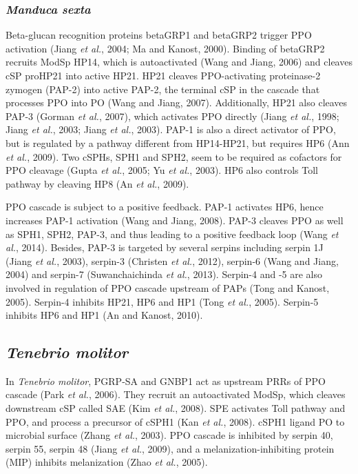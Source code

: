 \documentclass[11pt]{article}
\begin{document}
\subsubsection{\textit{Manduca sexta}}
Beta-glucan recognition proteins betaGRP1 and betaGRP2 trigger PPO activation (Jiang \textit{et al.}, 2004; Ma and Kanost, 2000). 
Binding of betaGRP2 recruits ModSp HP14, which is autoactivated (Wang and Jiang, 2006) and cleaves cSP proHP21 into active HP21. 
HP21 cleaves PPO-activating proteinase-2 zymogen (PAP-2) into active PAP-2, the terminal cSP in the cascade that processes PPO into PO (Wang and Jiang, 2007). 
Additionally, HP21 also cleaves PAP-3 (Gorman \textit{et al.}, 2007), which activates PPO directly (Jiang \textit{et al.}, 1998; Jiang \textit{et al.}, 2003; Jiang \textit{et al.}, 2003). 
PAP-1 is also a direct activator of PPO, but is regulated by a pathway different from HP14-HP21, but requires HP6 (Ann \textit{et al.}, 2009). 
Two cSPHs, SPH1 and SPH2, seem to be required as cofactors for PPO cleavage (Gupta \textit{et al.}, 2005; Yu \textit{et al.}, 2003). 
HP6 also controls Toll pathway by cleaving HP8 (An \textit{et al.}, 2009).

\newline

PPO cascade is subject to a positive feedback. 
PAP-1 activates HP6, hence increases PAP-1 activation (Wang and Jiang, 2008). 
PAP-3 cleaves PPO as well as SPH1, SPH2, PAP-3, and thus leading to a positive feedback loop (Wang \textit{et al.}, 2014). 
Besides, PAP-3 is targeted by several serpins including serpin 1J (Jiang \textit{et al.}, 2003), serpin-3 (Christen \textit{et al.}, 2012), serpin-6 (Wang and Jiang, 2004) and serpin-7 (Suwanchaichinda \textit{et al.}, 2013). 
Serpin-4 and -5 are also involved in regulation of PPO cascade upstream of PAPs (Tong and Kanost, 2005). 
Serpin-4 inhibits HP21, HP6 and HP1 (Tong \textit{et al.}, 2005). 
Serpin-5 inhibits HP6 and HP1 (An and Kanost, 2010). 

\subsection{\textit{Tenebrio molitor}}
In \textit{Tenebrio molitor}, PGRP-SA and GNBP1 act as upstream PRRs of PPO cascade (Park \textit{et al.}, 2006). 
They recruit an autoactivated ModSp, which cleaves downstream cSP called SAE (Kim \textit{et al.}, 2008). 
SPE activates Toll pathway and PPO, and process a precursor of cSPH1 (Kan \textit{et al.}, 2008). 
cSPH1 ligand PO to microbial surface (Zhang \textit{et al.}, 2003). 
PPO cascade is inhibited by serpin 40, serpin 55, serpin 48 (Jiang \textit{et al.}, 2009), and a melanization-inhibiting protein (MIP) inhibits melanization (Zhao \textit{et al.}, 2005).
\end{document}
